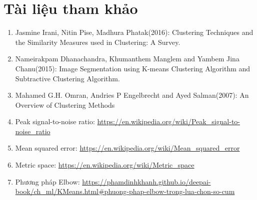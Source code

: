 \documentclass{article}
\begin{document}
    \section{Tài liệu tham khảo}
    \begin{enumerate}
        \item Jasmine Irani, Nitin Pise, Madhura Phatak(2016): Clustering Techniques and the Similarity Measures used in Clustering: A Survey.
        \item Nameirakpam Dhanachandra, Khumanthem Manglem and Yambem Jina Chanu(2015): Image Segmentation using K-means Clustering Algorithm and Subtractive Clustering Algorithm.
        \item Mahamed G.H. Omran, Andries P Engelbrecht and Ayed Salman(2007): An Overview of Clustering Methods
        \item Peak signal-to-noise ratio: \url{https://en.wikipedia.org/wiki/Peak\_signal-to-noise\_ratio}
        \item Mean squared error: \url{https://en.wikipedia.org/wiki/Mean\_squared\_error}
        \item Metric space: \url{https://en.wikipedia.org/wiki/Metric\_space}
        \item Phương pháp Elbow: \url{https://phamdinhkhanh.github.io/deepai-book/ch\_ml/KMeans.html#phuong-phap-elbow-trong-lua-chon-so-cum}
    \end{enumerate}
\end{document}
